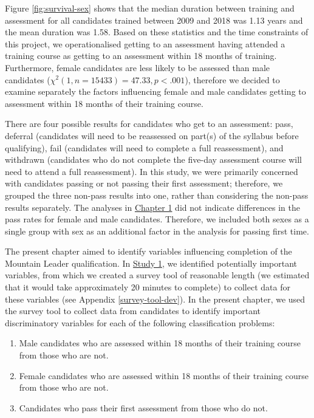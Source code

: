 \documentclass[
  12pt,
  a4paper,
]{book}
\providecommand{\tightlist}{%
  \setlength{\itemsep}{0pt}\setlength{\parskip}{0pt}}
\begin{document}
Figure \ref{fig:survival-sex} shows that the median duration between training and assessment for all candidates trained between 2009 and 2018 was 1.13 years and the mean duration was 1.58. Based on these statistics and the time constraints of this project, we operationalised getting to an assessment having attended a training course as getting to an assessment within 18 months of training. Furthermore, female candidates are less likely to be assessed than male candidates (\(\chi^2( 1 ,n = 15433 )= 47.33 ,p<.001\)), therefore we decided to examine separately the factors influencing female and male candidates getting to assessment within 18 months of their training course.

There are four possible results for candidates who get to an assessment: pass, deferral (candidates will need to be reassessed on part(s) of the syllabus before qualifying), fail (candidates will need to complete a full reassessment), and withdrawn (candidates who do not complete the five-day assessment course will need to attend a full reassessment). In this study, we were primarily concerned with candidates passing or not passing their first assessment; therefore, we grouped the three non-pass results into one, rather than considering the non-pass results separately. The analyses in \protect\hyperlink{gen-intro}{Chapter 1} did not indicate differences in the pass rates for female and male candidates. Therefore, we included both sexes as a single group with sex as an additional factor in the analysis for passing first time.

The present chapter aimed to identify variables influencing completion of the Mountain Leader qualification. In \protect\hyperlink{ml-qualitative}{Study 1}, we identified potentially important variables, from which we created a survey tool of reasonable length (we estimated that it would take approximately 20 minutes to complete) to collect data for these variables (see Appendix \ref{survey-tool-dev}). In the present chapter, we used the survey tool to collect data from candidates to identify important discriminatory variables for each of the following classification problems:

\begin{enumerate}
\def\labelenumi{\arabic{enumi}.}
\tightlist
\item
  Male candidates who are assessed within 18 months of their training course from those who are not.
\item
  Female candidates who are assessed within 18 months of their training course from those who are not.
\item
  Candidates who pass their first assessment from those who do not.
\end{enumerate}
\end{document}
